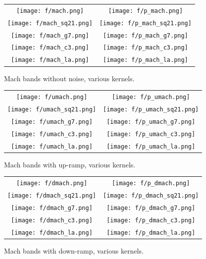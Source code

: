 \documentclass[12pt]{article}                  %
\begin{document}
\begin{figure}
	\begin{tabular}{cc}
		\texttt{[image: f/mach.png]} &
		\texttt{[image: f/p\_mach.png]} \\
		\texttt{[image: f/mach\_sq21.png]} &
		\texttt{[image: f/p\_mach\_sq21.png]} \\
		\texttt{[image: f/mach\_g7.png]} &
		\texttt{[image: f/p\_mach\_g7.png]} \\
		\texttt{[image: f/mach\_c3.png]} &
		\texttt{[image: f/p\_mach\_c3.png]} \\
		\texttt{[image: f/mach\_la.png]} &
		\texttt{[image: f/p\_mach\_la.png]} \\
	\end{tabular}
	\caption{\label{fig:machnonoise}
		Mach bands without noise, various kernels.
	}
\end{figure}

\begin{figure}
	\begin{tabular}{cc}
		\texttt{[image: f/umach.png]} &
		\texttt{[image: f/p\_umach.png]} \\
		\texttt{[image: f/umach\_sq21.png]} &
		\texttt{[image: f/p\_umach\_sq21.png]} \\
		\texttt{[image: f/umach\_g7.png]} &
		\texttt{[image: f/p\_umach\_g7.png]} \\
		\texttt{[image: f/umach\_c3.png]} &
		\texttt{[image: f/p\_umach\_c3.png]} \\
		\texttt{[image: f/umach\_la.png]} &
		\texttt{[image: f/p\_umach\_la.png]} \\
	\end{tabular}
	\caption{\label{fig:machup}
		Mach bands with up-ramp, various kernels.
	}
\end{figure}

\begin{figure}
	\begin{tabular}{cc}
		\texttt{[image: f/dmach.png]} &
		\texttt{[image: f/p\_dmach.png]} \\
		\texttt{[image: f/dmach\_sq21.png]} &
		\texttt{[image: f/p\_dmach\_sq21.png]} \\
		\texttt{[image: f/dmach\_g7.png]} &
		\texttt{[image: f/p\_dmach\_g7.png]} \\
		\texttt{[image: f/dmach\_c3.png]} &
		\texttt{[image: f/p\_dmach\_c3.png]} \\
		\texttt{[image: f/dmach\_la.png]} &
		\texttt{[image: f/p\_dmach\_la.png]} \\
	\end{tabular}
	\caption{\label{fig:machdown}
		Mach bands with down-ramp, various kernels.
	}
\end{figure}
\end{document}
